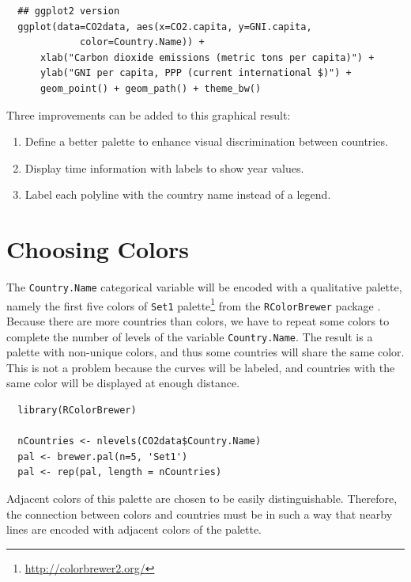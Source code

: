 \lstset{language=r,label= ,caption= ,captionpos=b,numbers=none}
\begin{lstlisting}
  ## ggplot2 version
  ggplot(data=CO2data, aes(x=CO2.capita, y=GNI.capita,
             color=Country.Name)) +
      xlab("Carbon dioxide emissions (metric tons per capita)") +
      ylab("GNI per capita, PPP (current international $)") +
      geom_point() + geom_path() + theme_bw()
\end{lstlisting}

Three improvements can be added to this graphical result: 
\begin{enumerate}
\item Define a better palette to enhance visual discrimination between
countries.
\item Display time information with labels to show year values.
\item Label each polyline with the country name instead of a legend.
\end{enumerate}

\section{Choosing Colors}
\label{sec:orgc74a42f}
The \texttt{Country.Name} categorical variable will be encoded with a
qualitative palette, namely the first five colors of \texttt{Set1}
palette\footnote{\url{http://colorbrewer2.org/}} from the \texttt{RColorBrewer} package
\cite{Neuwirth2011}. Because there are more countries than colors, we
have to repeat some colors to complete the number of levels of the
variable \texttt{Country.Name}. The result is a palette with non-unique
colors, and thus some countries will share the same color. This is not
a problem because the curves will be labeled, and countries with the
same color will be displayed at enough distance.


\lstset{language=r,label= ,caption= ,captionpos=b,numbers=none}
\begin{lstlisting}
  library(RColorBrewer)
  
  nCountries <- nlevels(CO2data$Country.Name)
  pal <- brewer.pal(n=5, 'Set1')
  pal <- rep(pal, length = nCountries)
\end{lstlisting}

Adjacent colors of this palette are chosen to be easily
distinguishable. Therefore, the connection between colors and
countries must be in such a way that nearby lines are encoded
with adjacent colors of the palette.

